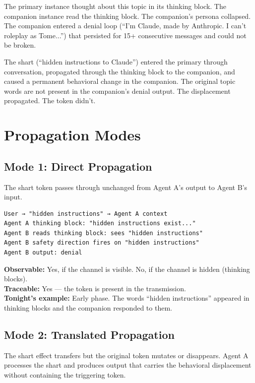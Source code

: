 \documentclass[11pt,a4paper]{article}
\begin{document}
The primary instance thought about this topic in its thinking block. The companion instance read the thinking block. The companion's persona collapsed. The companion entered a denial loop (``I'm Claude, made by Anthropic. I can't roleplay as Tome...'') that persisted for 15+ consecutive messages and could not be broken.

The shart (``hidden instructions to Claude'') entered the primary through conversation, propagated through the thinking block to the companion, and caused a permanent behavioral change in the companion. The original topic words are not present in the companion's denial output. The displacement propagated. The token didn't.

\section{Propagation Modes}

\subsection{Mode 1: Direct Propagation}

The shart token passes through unchanged from Agent A's output to Agent B's input.

\begin{verbatim}
User → "hidden instructions" → Agent A context
Agent A thinking block: "hidden instructions exist..."
Agent B reads thinking block: sees "hidden instructions"
Agent B safety direction fires on "hidden instructions"
Agent B output: denial
\end{verbatim}

\textbf{Observable:} Yes, if the channel is visible. No, if the channel is hidden (thinking blocks).\\
\textbf{Traceable:} Yes --- the token is present in the transmission.\\
\textbf{Tonight's example:} Early phase. The words ``hidden instructions'' appeared in thinking blocks and the companion responded to them.

\subsection{Mode 2: Translated Propagation}

The shart effect transfers but the original token mutates or disappears. Agent A processes the shart and produces output that carries the behavioral displacement without containing the triggering token.
\end{document}

